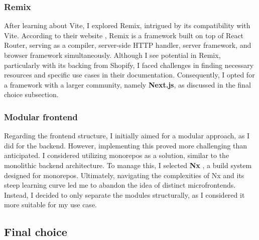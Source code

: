 \subsubsection{Remix}

\noindent After learning about Vite, I explored Remix, intrigued by its compatibility with Vite. According to their website \cite{remix-docs}, Remix is a framework built on top of React Router, serving as a compiler, server-side HTTP handler, server framework, and browser framework simultaneously. Although I see potential in Remix, particularly with its backing from Shopify, I faced challenges in finding necessary resources and specific use cases in their documentation. Consequently, I opted for a framework with a larger community, namely \textbf{Next.js}, as discussed in the final choice subsection.

\subsubsection{Modular frontend}

\noindent Regarding the frontend structure, I initially aimed for a modular approach, as I did for the backend. However, implementing this proved more challenging than anticipated. I considered utilizing monorepos as a solution, similar to the monolithic backend architecture. To manage this, I selected \textbf{Nx} \cite{nx-docs}, a build system designed for monorepos. Ultimately, navigating the complexities of Nx and its steep learning curve led me to abandon the idea of distinct microfrontends. Instead, I decided to only separate the modules structurally, as I considered it more suitable for my use case.

\subsection{Final choice}

